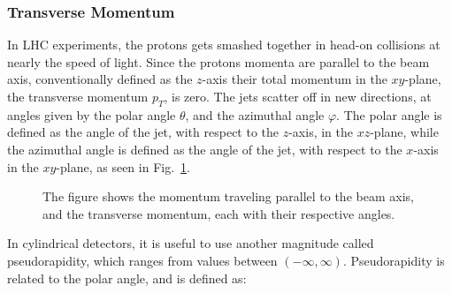 \documentclass[12pt,a4paper]{article}
\numberwithin{equation}{section}
\begin{document}
\subsubsection{Transverse Momentum}\label{sec:transmomentum}
In LHC experiments, the protons gets smashed together in head-on collisions at
nearly the speed of light. Since the protons momenta are parallel to the
beam axis, conventionally defined as the $z$-axis their total momentum in the
$xy$-plane, the transverse momentum $p_T$, is zero. The jets scatter off in new
directions, at angles given by the polar angle $\theta$, and the azimuthal angle $\varphi$.
The polar angle is defined as the angle of the jet, with respect to the
$z$-axis, in the $xz$-plane, while the azimuthal angle is defined as the angle
of the jet, with respect to the $x$-axis in the $xy$-plane, as seen in
Fig.~\ref{fig:momentum}.

\begin{figure}[H]
  \centering
  \caption{The figure shows the momentum traveling parallel to the beam axis, and
  the transverse momentum, each with their respective angles.\label{fig:momentum}}
\end{figure}

In cylindrical detectors, it is useful to use another magnitude called
pseudorapidity, which ranges from values between $(-\infty, \infty)$. Pseudorapidity is
related to the polar angle, and is defined as:
\end{document}
